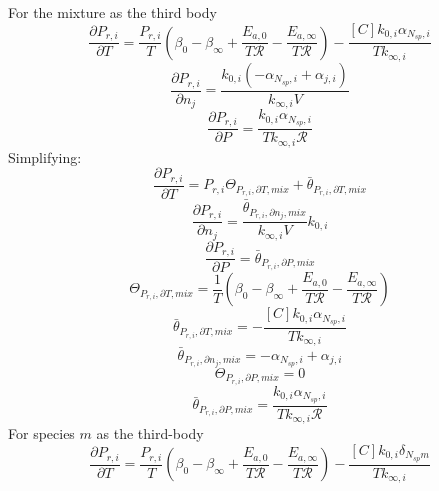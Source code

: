\documentclass[a4paper,10pt]{article}
\newcommand{\ns}{N_{sp}}
\newcommand{\Ru}{\mathcal{R}}
\begin{document}
For the mixture as the third body
\begin{dmath} \frac{\partial P_{r, i} }{\partial T } = \frac{P_{r, i}}{T} \left(\beta_{0} - \beta_{\infty} + \frac{E_{a, 0}}{T \Ru} - \frac{E_{a, \infty}}{T \Ru}\right) - \frac{[C] k_{0, i} \alpha_{\ns,i}}{T k_{\infty, i}}\end{dmath} 
\begin{dmath} \frac{\partial P_{r, i} }{\partial {n_j} } = \frac{k_{0, i} \left(- \alpha_{\ns,i} + \alpha_{j,i}\right)}{k_{\infty, i} V}\end{dmath} 
\begin{dmath} \frac{\partial P_{r, i} }{\partial P } = \frac{k_{0, i} \alpha_{\ns,i}}{T k_{\infty, i} \Ru}\end{dmath} 
Simplifying:
\begin{dmath} \frac{\partial P_{r, i} }{\partial T } = P_{r, i} \Theta_{P_{r,i}, \partial T, mix} + \bar{\theta}_{P_{r, i}, \partial T, mix}\end{dmath} 
\begin{dmath} \frac{\partial P_{r, i} }{\partial {n_j} } = \frac{\bar{\theta}_{P_{r, i}, \partial n_j, mix}}{k_{\infty, i} V} k_{0, i}\end{dmath} 
\begin{dmath} \frac{\partial P_{r, i} }{\partial P } = \bar{\theta}_{P_{r, i}, \partial P, mix}\end{dmath} 
\begin{dmath} \Theta_{P_{r,i}, \partial T, mix} = \frac{1}{T} \left(\beta_{0} - \beta_{\infty} + \frac{E_{a, 0}}{T \Ru} - \frac{E_{a, \infty}}{T \Ru}\right)\end{dmath} 
\begin{dmath} \bar{\theta}_{P_{r, i}, \partial T, mix} = - \frac{[C] k_{0, i} \alpha_{\ns,i}}{T k_{\infty, i}}\end{dmath} 
\begin{dmath} \bar{\theta}_{P_{r, i}, \partial n_j, mix} = - \alpha_{\ns,i} + \alpha_{j,i}\end{dmath} 
\begin{dmath} \Theta_{P_{r,i}, \partial P, mix} = 0\end{dmath} 
\begin{dmath} \bar{\theta}_{P_{r, i}, \partial P, mix} = \frac{k_{0, i} \alpha_{\ns,i}}{T k_{\infty, i} \Ru}\end{dmath} 
For species $m$ as the third-body
\begin{dmath} \frac{\partial P_{r, i} }{\partial T } = \frac{P_{r, i}}{T} \left(\beta_{0} - \beta_{\infty} + \frac{E_{a, 0}}{T \Ru} - \frac{E_{a, \infty}}{T \Ru}\right) - \frac{[C] k_{0, i} \delta_{\ns m}}{T k_{\infty, i}}\end{dmath} 
\end{document}
